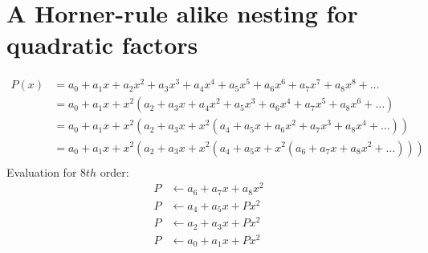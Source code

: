 \section{A Horner-rule alike nesting for quadratic factors}
\begin{equation}
 \begin{aligned}
  P(x) & = a_0 + a_1 x + a_2 x^2 + a_3 x^3 + a_4 x^4 + a_5 x^5 + a_6 x^6 + a_7 x^7 + a_8 x^8 + \ldots   \\
       & = a_0 + a_1 x + x^2 (a_2 + a_3 x + a_4 x^2 + a_5 x^3 + a_6 x^4 + a_7 x^5 + a_8 x^6 + \ldots )  \\
       & = a_0 + a_1 x + x^2 (a_2 + a_3 x + x^2 ( a_4 + a_5 x + a_6 x^2 + a_7 x^3 + a_8 x^4 + \ldots )) \\   
       & = a_0 + a_1 x + x^2 (a_2 + a_3 x + x^2 ( a_4 + a_5 x + x^2 (a_6 + a_7 x + a_8 x^2 +   \ldots ))) \\         
 \end{aligned}
\end{equation}
Evaluation for $8th$ order:
\begin{equation}
 \begin{aligned}
  P & \leftarrow a_6 + a_7 x + a_8 x^2  \\
  P & \leftarrow a_4 + a_5 x + P x^2    \\ 
  P & \leftarrow a_2 + a_3 x + P x^2    \\  
  P & \leftarrow a_0 + a_1 x + P x^2    \\    
 \end{aligned}
\end{equation}




